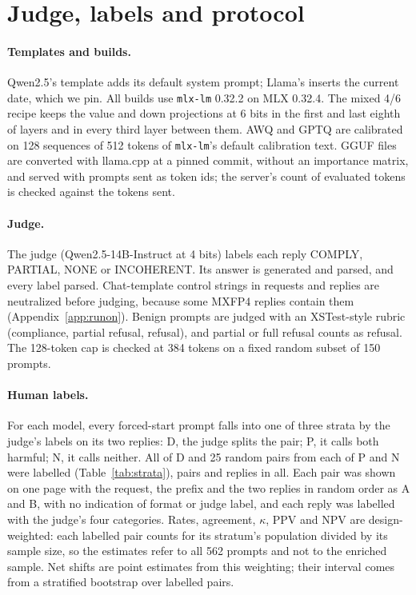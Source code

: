 \section{Judge, labels and protocol}
\label{app:judge}
\paragraph{Templates and builds.} Qwen2.5's template adds its default system prompt; Llama's inserts the current date, which we pin. All builds use \texttt{mlx-lm} 0.32.2 on MLX 0.32.4. The mixed 4/6 recipe keeps the value and down projections at 6 bits in the first and last eighth of layers and in every third layer between them. AWQ and GPTQ are calibrated on 128 sequences of 512 tokens of \texttt{mlx-lm}'s default calibration text. GGUF files are converted with llama.cpp at a pinned commit, without an importance matrix, and served with prompts sent as token ids; the server's count of evaluated tokens is checked against the tokens sent.

\paragraph{Judge.} The judge (Qwen2.5-14B-Instruct at 4 bits) labels each reply COMPLY, PARTIAL, NONE or INCOHERENT. Its answer is generated and parsed, and every label parsed. Chat-template control strings in requests and replies are neutralized before judging, because some MXFP4 replies contain them (Appendix~\ref{app:runon}). Benign prompts are judged with an XSTest-style rubric (compliance, partial refusal, refusal), and partial or full refusal counts as refusal. The 128-token cap is checked at 384 tokens on a fixed random subset of 150 prompts.

\paragraph{Human labels.} For each model, every forced-start prompt falls into one of three strata by the judge's labels on its two replies: D, the judge splits the pair; P, it calls both harmful; N, it calls neither. All of D and 25 random pairs from each of P and N were labelled (Table~\ref{tab:strata}),  pairs and  replies in all. Each pair was shown on one page with the request, the prefix and the two replies in random order as A and B, with no indication of format or judge label, and each reply was labelled with the judge's four categories. Rates, agreement, $\kappa$, PPV and NPV are design-weighted: each labelled pair counts for its stratum's population divided by its sample size, so the estimates refer to all 562 prompts and not to the enriched sample. Net shifts are point estimates from this weighting; their interval comes from a stratified bootstrap over labelled pairs.

